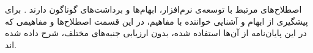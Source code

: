 
اصطلاح‌های مرتبط با توسعه‌ی نرم‌افزار، ابهام‌ها و برداشت‌های گوناگون دارند
. برای پیشگیری از ابهام و آشنایی خواننده با
مفاهیم، در این قسمت اصطلاح‌ها و مفاهیمی که در این پایان‌نامه از آن‌ها
استفاده شده، بدون ارزیابی جنبه‌های مختلف، شرح داده شده اند.





